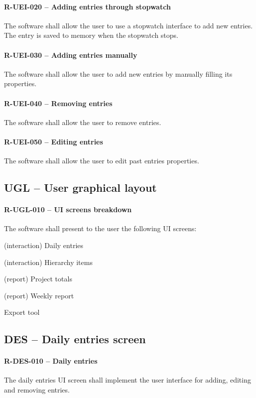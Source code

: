 \paragraph{R-UEI-020 -- Adding entries through stopwatch}
The software shall allow the user to use a stopwatch interface to
add new entries. The entry is saved to memory when the stopwatch stops.

\paragraph{R-UEI-030 -- Adding entries manually}
The software shall allow the user to add new entries by manually filling
its properties.

\paragraph{R-UEI-040 -- Removing entries}
The software shall allow the user to remove entries.

\paragraph{R-UEI-050 -- Editing entries}
The software shall allow the user to edit past entries properties.

\subsection{UGL -- User graphical layout}
\paragraph{R-UGL-010 -- \gls{UI} screens breakdown}
The software shall present to the user the following \gls{UI} screens:

\begin{compactitem}
\item (interaction) Daily entries
\item (interaction) Hierarchy items
\item (report) Project totals
\item (report) Weekly report
\item Export tool
\end{compactitem}

\subsection{DES -- Daily entries screen}
\paragraph{R-DES-010 -- Daily entries}
The daily entries \gls{UI} screen shall implement the user interface for adding,
editing and removing entries.

